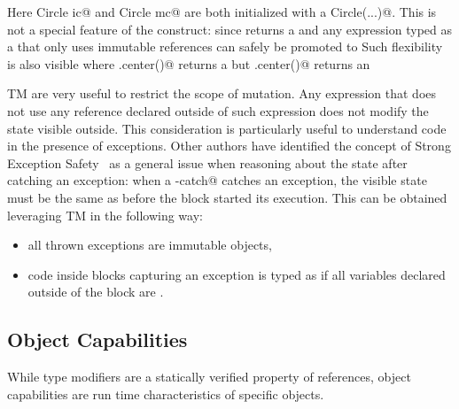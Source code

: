 Here \Q@imm Circle ic@ and \Q@mut Circle mc@ are both initialized with a \Q@new Circle(...)@.
This is not a special feature of the \Q@new@ construct: since \Q@new@ returns a \Q@mut@ and any expression typed as a \Q@mut@ that only uses immutable references can safely be promoted to \Q@imm@
 Such flexibility is also visible where \Q@rc.center()@ returns a \Q@read@ but \Q@ic.center()@ returns an \Q@imm@ %





\loseSpace

TM are very useful to restrict the scope of mutation. 
Any expression that does not use any \Q@mut@ 
reference declared outside of such expression does not modify the state visible outside. This consideration is particularly useful to understand code in the presence of exceptions. Other authors have identified the concept of Strong Exception Safety~\cite{Abrahams2000} as a general issue when reasoning about the state after catching an exception:
when a \Q@try-catch@ catches an exception, the visible state must be the same as before the \Q@try@ block started its execution.
This can be obtained leveraging TM in the following way:
\begin{itemize}
\item all thrown exceptions are immutable objects,
\item code inside \Q@try@ blocks capturing an exception is typed as if all \Q@mut@ variables declared outside of the block are \Q@read@.
\end{itemize}

\subsection{Object Capabilities}

While type modifiers are a statically verified property of references, object capabilities are run time characteristics of specific objects.

